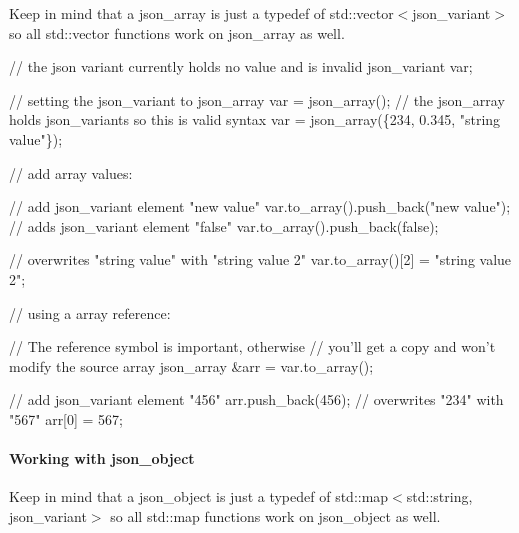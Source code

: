 Keep in mind that a {\ttfamily json\+\_\+array} is just a {\ttfamily typedef} of {\ttfamily std\+::vector$<$json\+\_\+variant$>$} so all {\ttfamily std\+::vector} functions work on {\ttfamily json\+\_\+array} as well.


\begin{DoxyCode}
\textcolor{comment}{// the json variant currently holds no value and is invalid}
json\_variant var;

\textcolor{comment}{// setting the json\_variant to json\_array}
var = json\_array();
\textcolor{comment}{// the json\_array holds json\_variants so this is valid syntax}
var = json\_array(\{234, 0.345, \textcolor{stringliteral}{"string value"}\});

\textcolor{comment}{// add array values:}

\textcolor{comment}{// add json\_variant element "new value"}
var.to\_array().push\_back(\textcolor{stringliteral}{"new value"});
\textcolor{comment}{// adds json\_variant element "false"}
var.to\_array().push\_back(\textcolor{keyword}{false});                

\textcolor{comment}{// overwrites "string value" with "string value 2"}
var.to\_array()[2] = \textcolor{stringliteral}{"string value 2"};           

\textcolor{comment}{// using a array reference:}

\textcolor{comment}{// The reference symbol is important, otherwise }
\textcolor{comment}{// you'll get a copy and won't modify the source array}
json\_array &arr = var.to\_array();

\textcolor{comment}{// add json\_variant element "456"}
arr.push\_back(456);
 \textcolor{comment}{// overwrites "234" with "567"}
arr[0] = 567;     
\end{DoxyCode}


\paragraph*{\label{_working_with_json_object_section}%
Working with json\+\_\+object}

Keep in mind that a {\ttfamily json\+\_\+object} is just a {\ttfamily typedef} of {\ttfamily std\+::map$<$std\+::string, json\+\_\+variant$>$} so all {\ttfamily std\+::map} functions work on {\ttfamily json\+\_\+object} as well.


